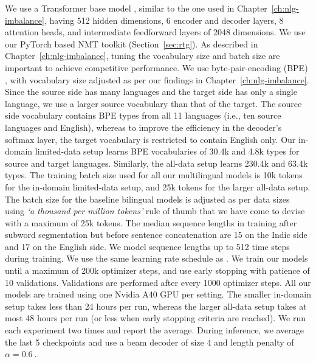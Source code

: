 We use a Transformer base model \cite{vaswani-2017-attention}, similar to the one used in Chapter~\ref{ch:nlg-imbalance}, having 512 hidden dimensions, 6 encoder and decoder layers, 8 attention heads, and intermediate feedforward layers of 2048 dimensions.
We use our PyTorch based NMT toolkit (Section~\ref{sec:rtg}).
As described in Chapter~\ref{ch:nlg-imbalance}, tuning the vocabulary size and batch size are important to achieve competitive performance.
We use byte-pair-encoding (BPE) \cite{sennrich-etal-2016-bpe}, with vocabulary size adjusted as per our findings in Chapter~\ref{ch:nlg-imbalance}. %
Since the source side has many languages and the target side has only a single language, we use a larger source vocabulary than that of the target.
The source side vocabulary contains BPE types from all 11 languages (i.e., ten source languages and English), whereas to improve the efficiency in the decoder's softmax layer, the target vocabulary is restricted to contain English only. 
Our in-domain limited-data setup learns BPE vocabularies of 30.4k and 4.8k types for source and target languages.
Similarly, the all-data setup learns 230.4k and 63.4k types.
The training batch size used for all our multilingual models is 10k tokens for the in-domain limited-data setup, and 25k tokens for the larger all-data setup.
The batch size for the baseline bilingual models is adjusted as per data sizes using \textit{`a thousand per million tokens'} rule of thumb that we have come to devise with a maximum of 25k tokens.
 The median sequence lengths in training after subword segmentation but before sentence concatenation are 15 on the Indic side and 17 on the English side. 
 We model sequence lengths up to 512 time steps during training.
We use the same learning rate schedule as \citet{vaswani-2017-attention}.
We train our models until a maximum of 200k optimizer steps, and use early stopping with patience of 10 validations.
Validations are performed after every 1000 optimizer steps.
All our models are trained using one Nvidia A40 GPU per setting. 
The smaller in-domain setup takes less than 24 hours per run, whereas the larger all-data setup takes at most 48 hours per run (or less when early stopping criteria are reached).
We run each experiment two times and report the average. During inference, we average the last 5 checkpoints and use a beam decoder of size 4 and length penalty of $\alpha=0.6~$\cite{vaswani-2017-attention,wu-etal-2016-GNMT}. 


